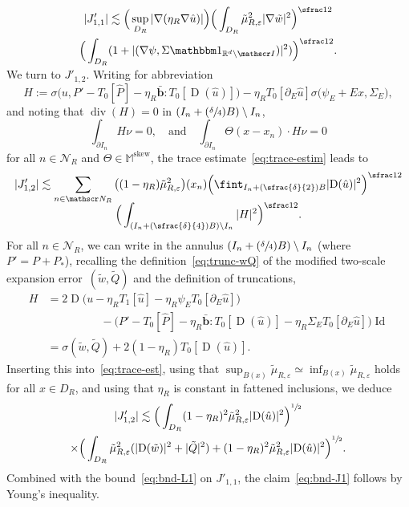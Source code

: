 \documentclass[JEP,XML,SOM,Unicode,published]{cedram}
\let\mathcal\mathscr
\newcommand{\Psfrac}[2]{(\sfrac{#1}{#2})}
\let\mathds\mathbbm
\theoremstyle{plain}
\theoremstyle{definition}
\newcommand{\e}{\varepsilon}
\newcommand{\R}{\mathbb R}
\newcommand{\Ic}{\mathcal I}
\newcommand{\Md}{\mathbb M}
\newcommand{\Nc}{\mathcal N}
\newcommand{\Id}{\operatorname{Id}}
\newcommand{\D}{\operatorname{D}}
\newcommand{\bb}{\bar{\boldsymbol b}}
\newcommand{\Div}{{\operatorname{div}}}
\newcommand{\Skew}{{\operatorname{skew}}}
\begin{document}
\begin{multline}\label{eq:bnd-L1}
|J'_{1,1}|\lesssim \Big(\sup_{D_R}|\nabla(\eta_R\nabla\hat u)|\Big)\Big(\int_{D_R}\tilde\mu_{R,\e}^2|\nabla\tilde w|^2\Big)^{\sfrac12}\\
\vspace*{-5pt}\Big(\int_{D_R}(1+|(\nabla\psi,\Sigma\mathds1_{\R^d\setminus\Ic})|^2)\Big)^{\sfrac12}.
\end{multline}
We turn to $J'_{1,2}$. Writing for abbreviation
\[H:=\sigma\big(u,P'-T_0[\hat P]-\eta_R\bb:T_0[\D(\hat u)]\big)-\eta_R T_0[\partial_E\hat u]\sigma(\psi_E+Ex,\Sigma_E\big),\]
and noting that $\Div(H)=0$ in $(I_n+\Psfrac\delta4B)\setminus I_n$,
\[
\int_{\partial I_n}H\nu=0, \quad\text{and}\quad \int_{\partial I_n}\Theta(x-x_n)\cdot H\nu=0
\]
for all $n\in\Nc_R$ and $\Theta\in\Md^\Skew$, the trace estimate~\eqref{eq:trace-estim} leads to
\begin{multline}\label{eq:trace-est}
|J'_{1,2}|\lesssim \sum_{n\in\Nc_R}\big((1-\eta_R)\tilde\mu_{R,\e}^2\big)(x_n)\Big(\fint_{I_n+\Psfrac\delta2 B}|\!\D(\hat u)|^2\Big)^{\sfrac12}\\[-5pt]
\Big(\int_{(I_n+\Psfrac\delta4B)\setminus I_n}|H|^2\Big)^{\sfrac12}.
\end{multline}
For all $n\in\Nc_R$, we can write in the annulus $(I_n+\Psfrac\delta4B)\setminus I_n$ (where $P'=P+P_*$), recalling the definition~\eqref{eq:trunc-wQ} of the modified two-scale expansion error~$(\tilde w,\tilde Q)$ and the definition of truncations,
\begin{align*}
H&= 2\D\!\big(u-\eta_RT_1[\hat u]-\eta_R\psi_ET_0[\partial_E\hat u]\big)\\
&\hspace{2cm}-\big(P'-T_0[\hat P]-\eta_R\bb:T_0[\D(\hat u)]-\eta_R\Sigma_ET_0[\partial_E\hat u]\big)\Id\\
&= \sigma(\tilde w,\tilde Q)+2(1-\eta_R)T_0[\D(\hat u)].
\end{align*}
Inserting this into~\eqref{eq:trace-est}, using that $\sup_{B(x)}\tilde\mu_{R,\e}\simeq\inf_{B(x)}\tilde\mu_{R,\e}$ holds for all $x\in D_R$, and using that $\eta_R$ is constant in fattened inclusions,
we deduce
\begin{multline*}
|J'_{1,2}|\lesssim \Big(\int_{D_R}(1-\eta_R)^2\tilde\mu_{R,\e}^2|\!\D(\hat u)|^2\Big)^{\sfrac12}\\
\times\Big(\int_{D_R}\tilde\mu_{R,\e}^2(|\!\D(\tilde w)|^2+|\tilde Q|^2)+(1-\eta_R)^2\tilde\mu_{R,\e}^2|\!\D(\hat u)|^2\Big)^{\sfrac12}.
\end{multline*}
Combined with the bound~\eqref{eq:bnd-L1} on $J'_{1,1}$, the claim~\eqref{eq:bnd-J1} follows by Young's inequality.
\end{document}
